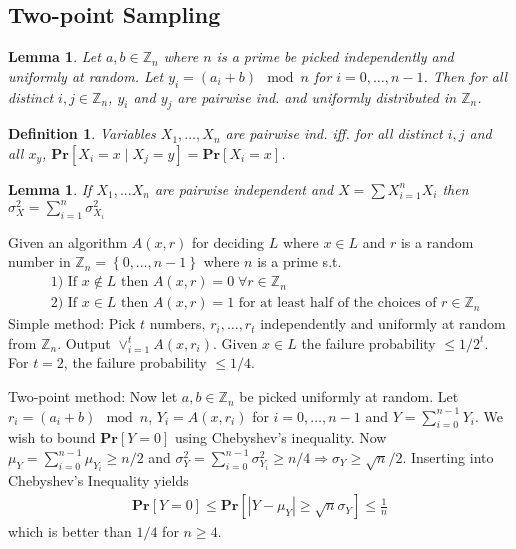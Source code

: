 \documentclass[12pt]{article}
\newtheorem{lem}[thm]{Lemma}
\newtheorem{dfn}[thm]{Definition}
\begin{document}
\subsection{Two-point Sampling}
\begin{lem}
Let $a,b \in \mathbb{Z}_n$ where $n$ is a prime be picked independently and uniformly at random. Let $y_i = (a_i + b) \mod n$ for $i = 0, \hdots, n-1$. Then for all distinct $i,j \in \mathbb{Z}_n$, $y_i$ and $y_j$ are pairwise ind. and uniformly distributed in $\mathbb{Z}_n$. \\
\end{lem}

\begin{dfn}
Variables $X_1, \hdots, X_n$ are pairwise ind. iff. for all distinct $i,j$ and all $x_y$, $\mathbf{Pr}\left[ X_i = x \; | \; X_j = y \right] = \mathbf{Pr}\left[ X_i = x \right]$. \\
\end{dfn}

\begin{lem}
If $X_1, ... X_n$ are pairwise independent and $X = \sum X_{i=1}^n X_i$ then $\sigma^2_X = \sum_{i=1}^n \sigma_{X_i}^2$
\end{lem}

Given an algorithm $A(x,r)$ for deciding $L$ where $x \in L$ and $r$ is a random number in $\mathbb{Z}_n = \left\{ 0, \hdots, n-1 \right\}$ where $n$ is a prime s.t.
\begin{align*}
&\text{1) If } x \not\in L \text{ then } A(x,r) = 0 \; \forall r \in \mathbb{Z}_n \\
&\text{2) If } x \in L \text{ then } A(x,r) = 1 \text{ for at least half of the choices of } r \in \mathbb{Z}_n
\end{align*}
Simple method: Pick $t$ numbers, $r_i, \hdots, r_t$ independently and uniformly at random from $\mathbb{Z}_n$. Output $\lor_{i=1}^t A(x,r_i)$. Given $x \in L$ the failure probability $\leq 1/2^t$. For $t=2$, the failure probability $\leq 1/4$.

Two-point method: Now let $a,b \in \mathbb{Z}_n$ be picked uniformly at random. Let $r_i = (a_i + b) \mod n$, $Y_i = A(x, r_i)$ for $i = 0, \hdots, n-1$ and $Y=\sum_{i=0}^{n-1}Y_i$. We wish to bound $\mathbf{Pr}\left[ Y=0 \right]$ using Chebyshev's inequality. Now $\mu_{Y} = \sum^{n-1}_{i=0}\mu_{Y_i} \geq n/2$ and $\sigma_Y^2 = \sum_{i=0}^{n-1} \sigma^2_{Y_{i}} \geq n/4 \Rightarrow \sigma_Y \geq \sqrt{n}/2$. Inserting into Chebyshev's Inequality yields
\begin{align*}
\mathbf{Pr}\left[ Y = 0 \right] \leq \mathbf{Pr}\left[ \left| Y - \mu_Y \right| \geq \sqrt{n} \sigma_Y \right] \leq \frac{1}{n}
\end{align*}
which is better than $1/4$ for $n \geq 4$.
\end{document}
